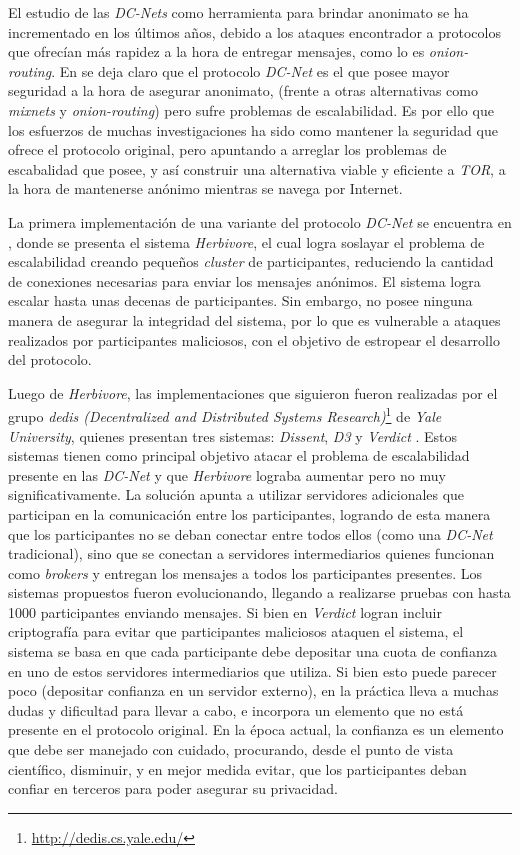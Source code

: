El estudio de las \emph{DC-Nets} como herramienta para brindar anonimato se ha incrementado en los últimos años, debido a los ataques 
encontrador a protocolos que ofrecían más rapidez a la hora de entregar mensajes, como lo es \emph{onion-routing}. En 
\cite{wright2002analysis} se deja claro que el protocolo \emph{DC-Net} es el que posee mayor seguridad a la hora de asegurar anonimato, 
(frente a otras alternativas como \emph{mixnets} y \emph{onion-routing})
pero sufre problemas de escalabilidad. Es por ello que los esfuerzos de muchas investigaciones ha sido como mantener la 
seguridad que ofrece el protocolo original, pero apuntando a arreglar los problemas de escabalidad que posee, y así construir 
una alternativa viable y eficiente a \emph{TOR}, a la hora de mantenerse anónimo mientras se navega por Internet.

La primera implementación de una variante del protocolo \emph{DC-Net} se encuentra en \cite{goel2003herbivore}, donde se presenta el 
sistema \emph{Herbivore}, el cual logra soslayar el problema de escalabilidad creando pequeños \emph{cluster} de participantes, 
reduciendo la cantidad de conexiones necesarias para enviar los mensajes anónimos. El sistema logra escalar hasta unas decenas 
de participantes. Sin embargo, no posee ninguna manera de asegurar la integridad del sistema, por lo que es vulnerable a 
ataques realizados por participantes maliciosos, con el objetivo de estropear el desarrollo del protocolo.

Luego de \emph{Herbivore}, las implementaciones que siguieron fueron realizadas por el grupo 
\emph{dedis (Decentralized and Distributed Systems Research)}\footnote{\url{http://dedis.cs.yale.edu/}} de \emph{Yale University}, 
quienes presentan tres sistemas: \emph{Dissent}, \emph{D3} y \emph{Verdict} 
\cite{corrigan2010dissent, wolinsky2012dissent, wolinsky2012scalable, corrigan2012proactively}. Estos sistemas tienen como principal 
objetivo atacar el problema de escalabilidad presente en las \emph{DC-Net} y que \emph{Herbivore} lograba aumentar pero no muy 
significativamente. La solución apunta a utilizar servidores adicionales que participan 
en la comunicación entre los participantes, logrando de esta manera que los participantes no se 
deban conectar entre todos ellos (como una \emph{DC-Net} tradicional), 
sino que se conectan a servidores intermediarios quienes funcionan como \emph{brokers} y entregan los mensajes a todos los participantes 
presentes. Los sistemas propuestos fueron evolucionando, llegando a realizarse pruebas con hasta 1000 participantes enviando mensajes. 
Si bien en \emph{Verdict} logran incluir criptografía para evitar que participantes maliciosos 
ataquen el sistema, el sistema se basa en que cada participante debe depositar una cuota de 
confianza en uno de estos servidores intermediarios que utiliza. Si bien esto puede parecer poco 
(depositar confianza en un servidor externo), en la práctica lleva a muchas dudas y dificultad 
para llevar a cabo, e incorpora un elemento que no está presente en el protocolo original. 
En la época actual, la confianza es un elemento que debe ser manejado con cuidado, procurando, 
desde el punto de vista científico, disminuir, y en mejor medida evitar, que los participantes 
deban confiar en terceros para poder asegurar su privacidad. 

